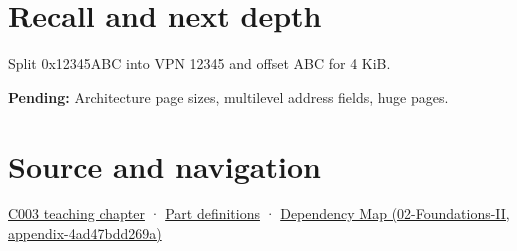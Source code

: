 \section{Recall and next depth}\label{appendix-0c67cd5bf30a-recall-and-next-depth}

Split 0x12345ABC into VPN 12345 and offset ABC for 4 KiB.

\textbf{Pending:} Architecture page sizes, multilevel address fields, huge pages.

\section{Source and navigation}\label{appendix-0c67cd5bf30a-source-and-navigation}

\href{Continuous\%20Notes/Computing\%20Foundations\%20-\%20From\%20Bits\%20to\%20C++\%20and\%20Systems\%20APIs\#Where\%20the\%20bytes\%20live}{C003 teaching chapter} · \hyperref[appendix-fd090d982a15-m003---parts-41-60]{Part definitions} · \href{../02-Foundations-II/main.pdf\#nameddest=appendix-4ad47bdd269a}{Dependency Map (02-Foundations-II, appendix-4ad47bdd269a)}
